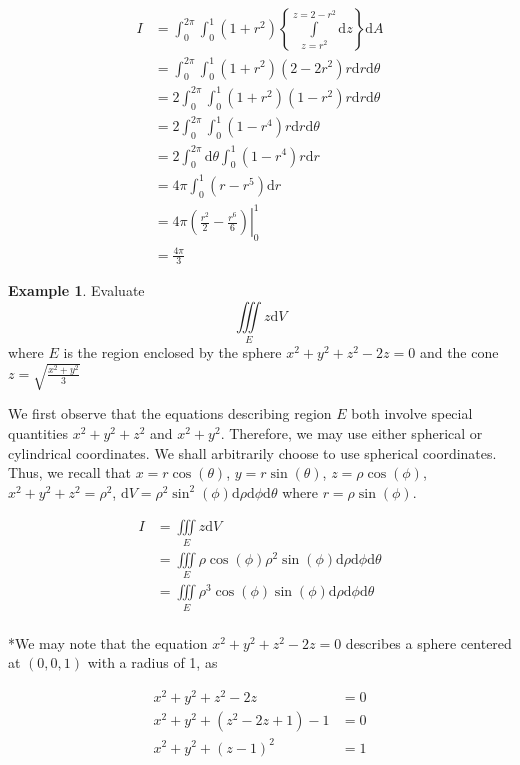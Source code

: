 \documentclass[11pt]{article}
\theoremstyle{plain} %
\theoremstyle{definition}
\theoremstyle{example}
\newtheorem*{example}{Example}
\theoremstyle{remark}
\begin{document}
\begin{align*}
I &= \int_0^{2\pi}\int_0^1 \left(1+r^2\right) \left\{\int\limits_{z=r^2}^{z=2-r^2} \mathrm d z \right\}\mathrm d A\\
&= \int_0^{2\pi}\int_0^1 \left(1+r^2\right) \left(2-2r^2\right)r \mathrm d r \mathrm d \theta\\
&= 2\int_0^{2\pi}\int_0^1 \left(1+r^2\right) \left(1-r^2\right)r \mathrm d r \mathrm d \theta\\
&= 2\int_0^{2\pi}\int_0^1 \left(1-r^4\right)r \mathrm d r \mathrm d \theta\\
&= 2\int_0^{2\pi}\mathrm d \theta\int_0^1 \left(1-r^4\right)r \mathrm d r \\
&= 4\pi\int_0^1 \left(r-r^5\right) \mathrm d r \\
&= 4\pi\left.\left(\frac{r^2}{2}-\frac{r^6}{6}\right)\right|_0^1\\
&= \frac{4\pi}{3}
\end{align*}


\begin{example}
Evaluate $$\iiint \limits_E z \mathrm d V$$ where $E$ is the region enclosed by the sphere $x^2+y^2+z^2-2z=0$ and the cone $z = \sqrt{\frac{x^2+y^2}{3}}$
\end{example}

We first observe that the equations describing region $E$ both involve special quantities $x^2 + y^2 + z^2$ and $x^2 + y^2$. Therefore, we may use either spherical or cylindrical coordinates. We shall arbitrarily choose to use spherical coordinates. Thus, we recall that $x=r\cos(\theta)$, $y = r \sin(\theta)$, $z = \rho \cos(\phi)$, $x^2 + y^2 + z^2 = \rho ^2$, $\mathrm d V = \rho^2 \sin^2(\phi)\mathrm d \rho \mathrm d \phi \mathrm d \theta$ where $r = \rho \sin(\phi)$.

\begin{align*}
I &= \iiint\limits_Ez \mathrm d V\\
	&= \iiint\limits_E\rho\cos(\phi)\rho^2\sin(\phi)\mathrm d \rho \mathrm d \phi \mathrm d \theta\\
	&= \iiint\limits_E\rho^3\cos(\phi)\sin(\phi)\mathrm d \rho \mathrm d \phi \mathrm d \theta\\
\end{align*}

*We may note that the equation $x^2+y^2+z^2-2z=0$ describes a sphere centered at $(0,0,1)$ with a radius of 1, as 

\begin{align*}
x^2+y^2+z^2-2z&=0\\
x^2+y^2+\left(z^2-2z+1\right)-1&=0\\
x^2+y^2+(z-1)^2&= 1
\end{align*}
\end{document}
